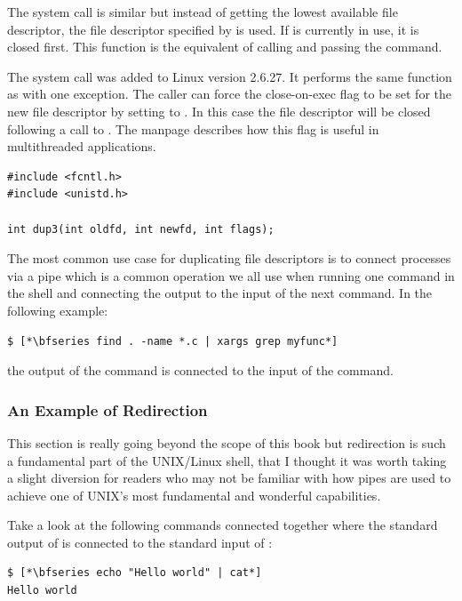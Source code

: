 The  system call is similar but instead of getting the lowest available file descriptor, the file descriptor specified by  is used. If  is currently in use, it is closed first. This function is the equivalent of calling  and passing the  command.

The  system call was added to Linux version 2.6.27. It performs the same function as  with one exception. The caller can force the close-on-exec flag to be set  for  the  new file  descriptor by setting  to .  In this case the file descriptor will be closed following a call to . The  manpage describes how this flag is useful in multithreaded applications.

\begin{lstlisting}
#include <fcntl.h> 
#include <unistd.h>

int dup3(int oldfd, int newfd, int flags);
\end{lstlisting}

\noindent
The most common use case for duplicating file descriptors is to connect processes via a pipe which is a common operation we all use when running one command in the shell and connecting the output to the input of the next command. In the following example:

\begin{lstlisting}
$ [*\bfseries find . -name *.c | xargs grep myfunc*]
\end{lstlisting}

\noindent
the output of the  command is connected to the input of the  command.

\subsubsection{An Example of Redirection}

This section is really going beyond the scope of this book but redirection is such a fundamental part of the UNIX/Linux shell, that I thought it was worth taking a slight diversion for readers who may not be familiar with how pipes are used to achieve one of UNIX's most fundamental and wonderful capabilities. 

Take a look at the following commands connected together where the standard output of  is connected to the standard input of :

\begin{lstlisting}
$ [*\bfseries echo "Hello world" | cat*]
Hello world
\end{lstlisting}

